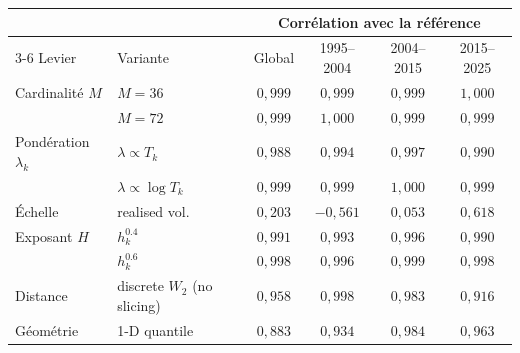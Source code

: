     \begin{tabular}{llcccc}
      \toprule
      & & \multicolumn{4}{c}{Corr\'elation avec la r\'ef\'erence} \\
      \cmidrule(lr){3-6}
      Levier & Variante & Global & 1995--2004 & 2004--2015 & 2015--2025 \\
      \midrule
      Cardinalit\'e \(M\) & $M=36$ & \(0{,}999\) & \(0{,}999\) & \(0{,}999\) & \(1{,}000\) \\
       & $M=72$ & \(0{,}999\) & \(1{,}000\) & \(0{,}999\) & \(0{,}999\) \\
      \addlinespace
      Pond\'eration \(\lambda_k\) & $\lambda \propto T_k$ & \(0{,}988\) & \(0{,}994\) & \(0{,}997\) & \(0{,}990\) \\
       & $\lambda \propto \log T_k$ & \(0{,}999\) & \(0{,}999\) & \(1{,}000\) & \(0{,}999\) \\
      \addlinespace
      \'Echelle & realised vol. & \(0{,}203\) & \(-0{,}561\) & \(0{,}053\) & \(0{,}618\) \\
      \addlinespace
      Exposant \(H\) & $h_k^{0.4}$ & \(0{,}991\) & \(0{,}993\) & \(0{,}996\) & \(0{,}990\) \\
       & $h_k^{0.6}$ & \(0{,}998\) & \(0{,}996\) & \(0{,}999\) & \(0{,}998\) \\
      \addlinespace
      Distance & discrete $W_2$ (no slicing) & \(0{,}958\) & \(0{,}998\) & \(0{,}983\) & \(0{,}916\) \\
      \addlinespace
      G\'eom\'etrie & 1-D quantile & \(0{,}883\) & \(0{,}934\) & \(0{,}984\) & \(0{,}963\) \\
      \bottomrule
    \end{tabular}%
